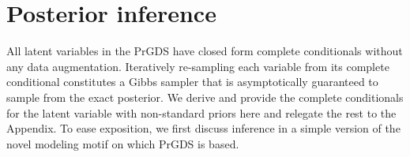 \documentclass{article}
\begin{document}


\section{Posterior inference}
\label{sec:mcmc}
All latent variables in the PrGDS have closed form complete conditionals without any data augmentation. Iteratively re-sampling each variable from its complete conditional constitutes a Gibbs sampler that is asymptotically guaranteed to sample from the exact posterior. We derive and provide the complete conditionals for the latent variable with non-standard priors here and relegate the rest to the Appendix. To ease exposition, we first discuss inference in a simple version of the novel modeling motif on which PrGDS is based.
\end{document}
